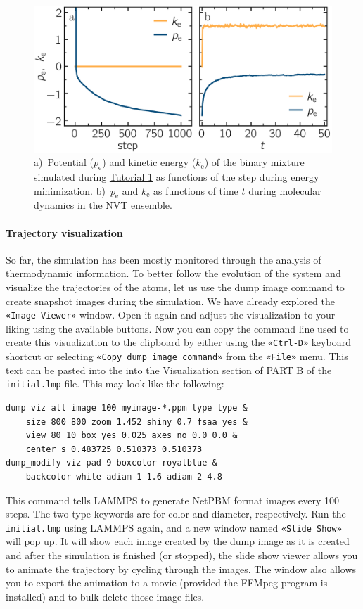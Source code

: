 \documentclass[9pt,tutorial]{livecoms}
\newcommand{\lmpcmd}[1]{\hspace{0pt}\colorbox{listing}{\textcolor{command}{\small{#1}}}\hspace{0pt}} %
\newcommand{\flecmd}[1]{\textcolor{command}{\texttt{#1}}} %
\newcommand{\guicmd}[1]{\textcolor{command}{\texttt{«#1»}}} %
\begin{document}
\begin{figure}
\centering
\includegraphics[width=\linewidth]{LJ-energy}
\caption{a)~Potential ($p_\text{e}$) and kinetic energy ($k_\text{e}$) of the
binary mixture simulated during \hyperref[lennard-jones-label]{Tutorial 1} as
functions of the step during energy minimization.
b)~$p_\text{e}$ and $k_\text{e}$ as functions of time $t$ during
molecular dynamics in the NVT ensemble.}
\label{fig:evolution-energy}
\end{figure}

\paragraph{Trajectory visualization}

So far, the simulation has been mostly monitored through the analysis of
thermodynamic information.  To better follow the evolution of the system and visualize
the trajectories of the atoms, let us use the \lmpcmd{dump image} command to
create snapshot images during the simulation.  We have already explored
the \guicmd{Image Viewer} window.  Open it again and adjust the
visualization to your liking using the available buttons.  Now you can
copy the command line used to create this visualization to the clipboard
by either using the \guicmd{Ctrl-D} keyboard shortcut or selecting
\guicmd{Copy dump image command} from the \guicmd{File} menu.  This text
can be pasted into the into the \lmpcmd{Visualization} section of
\lmpcmd{PART B} of the \flecmd{initial.lmp} file.  This may look like the following:

\begin{lstlisting}
dump viz all image 100 myimage-*.ppm type type &
    size 800 800 zoom 1.452 shiny 0.7 fsaa yes &
    view 80 10 box yes 0.025 axes no 0.0 0.0 &
    center s 0.483725 0.510373 0.510373
dump_modify viz pad 9 boxcolor royalblue &
    backcolor white adiam 1 1.6 adiam 2 4.8
\end{lstlisting}
This command tells LAMMPS to generate NetPBM format images every 100
steps.  The two \lmpcmd{type} keywords are for \lmpcmd{color} and
\lmpcmd{diameter}, respectively.  Run the \flecmd{initial.lmp} using
LAMMPS again, and a new window named \guicmd{Slide Show} will pop up.
It will show each image created by the \lmpcmd{dump image} as it is
created and after the simulation is finished (or stopped), the slide
show viewer allows you to animate the trajectory by cycling through the
images.  The window also allows you to export the animation to a movie
(provided the FFMpeg program is installed) and to bulk delete those
image files.
\end{document}

